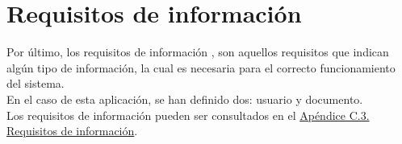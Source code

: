 \section{Requisitos de información}

Por último, los requisitos de información \cite{requisitos}, son aquellos requisitos que indican algún tipo de información, la cual es necesaria para el correcto funcionamiento del sistema.
\\

En el caso de esta aplicación, se han definido dos: usuario y documento.
\\

Los requisitos de información pueden ser consultados en el \hyperref[APRequisitosInformacion]{Apéndice C.3. Requisitos de información}.